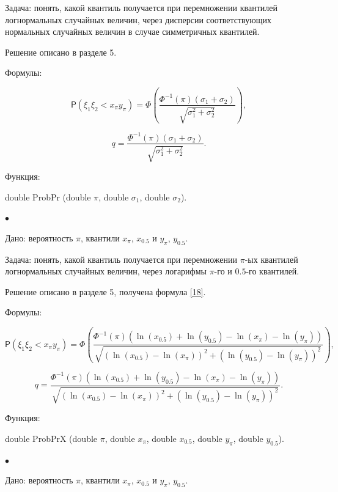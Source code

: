 \documentclass[12pt]{article}
\begin{document}
	Задача:
	понять, какой квантиль получается при перемножении квантилей логнормальных случайных величин, через дисперсии соответствующих нормальных случайных величин в случае симметричных квантилей.
	
	Решение описано в разделе 5.
	
	Формулы:
	
	\begin{equation*}
		\mathsf{P}(\xi_{1}\xi_{2}< x_{\pi}y_{\pi}) = \Phi\left(\frac{\Phi^{-1}(\pi)(\sigma_{1}+\sigma_{2})}{\sqrt{\sigma_{1}^{2}+\sigma_{2}^{2}}}\right),
	\end{equation*}
	
	\begin{equation*}
		q =\frac{\Phi^{-1}(\pi)(\sigma_{1}+\sigma_{2})}{\sqrt{\sigma_{1}^{2}+\sigma_{2}^{2}}}.
	\end{equation*}
	
	Функция:
	
	double ProbPr (double $\pi$, double $\sigma_{1}$, double $\sigma_{2}$).
	
	$\bullet$
	
	Дано:
	вероятность $\pi$, квантили $x_{\pi}$, $x_{0.5}$ и $y_{\pi}$, $y_{0.5}$.
	
	Задача:
	понять, какой квантиль получается при перемножении $\pi$-ых квантилей логнормальных случайных величин, через логарифмы $\pi$-го и $0.5$-го квантилей.
	
	Решение описано в разделе 5, получена формула \eqref{18}.
	
	Формулы:
	
	\begin{equation*}
		\mathsf{P}(\xi_{1}\xi_{2}< x_{\pi}y_{\pi}) =\Phi\left(\frac{\Phi^{-1}(\pi)(\ln(x_{0.5})+\ln(y_{0.5})-\ln(x_{\pi})-\ln(y_{\pi}))}{\sqrt{(\ln(x_{0.5})-\ln(x_{\pi}))^{2}+(\ln(y_{0.5})-\ln(y_{\pi}))^{2}}}\right),
	\end{equation*}
	
	\begin{equation*}
		q =\frac{\Phi^{-1}(\pi)(\ln(x_{0.5})+\ln(y_{0.5})-\ln(x_{\pi})-\ln(y_{\pi}))}{\sqrt{(\ln(x_{0.5})-\ln(x_{\pi}))^{2}+(\ln(y_{0.5})-\ln(y_{\pi}))^{2}}}.
	\end{equation*}
	
	Функция:
	
	double ProbPrX (double $\pi$, double $x_{\pi}$, double $x_{0.5}$, double $y_{\pi}$, double $y_{0.5}$).
	
	
	$\bullet$
	
	Дано:
	вероятность $\pi$, квантили $x_{\pi}$, $x_{0.5}$ и $y_{\pi}$, $y_{0.5}$.
	
\end{document}
